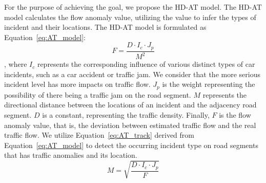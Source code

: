 For the purpose of achieving the goal, we propose the HD-AT model. The HD-AT model calculates the flow anomaly value, utilizing the value to infer the types of incident and their locations. The HD-AT model is formulated as Equation~\ref{eq:AT_model}:
\begin{equation}\label{eq:AT_model}
	F = {\frac{D \cdot I_c \cdot J_p}{M^2}}
\end{equation}
, where $I_c$ represents the corresponding influence of various distinct types of car incidents, such as a car accident or traffic jam. We consider that the more serious incident level has more impacts on traffic flow. $J_p$ is the weight representing the possibility of there being a traffic jam on the road segment. $M$ represents the directional distance between the locations of an incident and the adjacency road segment. $D$ is a constant, representing the traffic density. Finally, $F$ is the flow anomaly value, that is, the deviation between estimated traffic flow and the real traffic flow.
We utilize Equation~\ref{eq:AT_track} derived from Equation~\ref{eq:AT_model} to detect the occurring incident type on road segments that has traffic anomalies and its location. 
\begin{equation}\label{eq:AT_track}
	M = {\sqrt{\frac{D \cdot I_c \cdot J_p}{F}}}
\end{equation}



